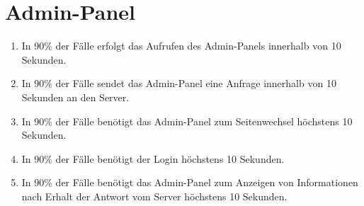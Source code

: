 \section{Admin-Panel}

\begin{enumerate}
    \item In 90\% der Fälle erfolgt das Aufrufen des Admin-Panels innerhalb von 10 Sekunden.
    \item In 90\% der Fälle sendet das Admin-Panel eine Anfrage innerhalb von 10 Sekunden an den Server.
    \item In 90\% der Fälle benötigt das Admin-Panel zum Seitenwechsel höchstens 10 Sekunden.
    \item In 90\% der Fälle benötigt der Login höchstens 10 Sekunden.
    \item In 90\% der Fälle benötigt das Admin-Panel zum Anzeigen von Informationen nach Erhalt der Antwort vom Server höchstens 10 Sekunden.
\end{enumerate}